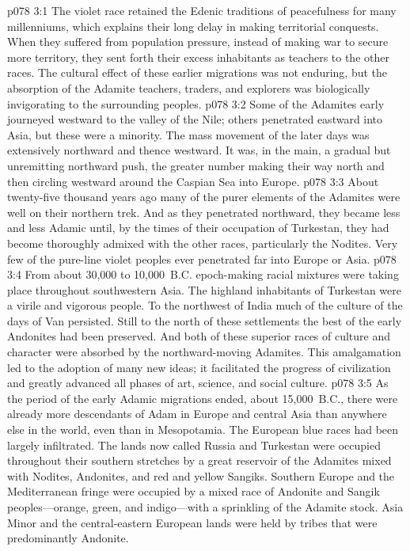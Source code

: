 \vs p078 3:1 The violet race retained the Edenic traditions of peacefulness for many millenniums, which explains their long delay in making territorial conquests. When they suffered from population pressure, instead of making war to secure more territory, they sent forth their excess inhabitants as teachers to the other races. The cultural effect of these earlier migrations was not enduring, but the absorption of the Adamite teachers, traders, and explorers was biologically invigorating to the surrounding peoples.
\vs p078 3:2 Some of the Adamites early journeyed westward to the valley of the Nile; others penetrated eastward into Asia, but these were a minority. The mass movement of the later days was extensively northward and thence westward. It was, in the main, a gradual but unremitting northward push, the greater number making their way north and then circling westward around the Caspian Sea into Europe.
\vs p078 3:3 About twenty\hyp{}five thousand years ago many of the purer elements of the Adamites were well on their northern trek. And as they penetrated northward, they became less and less Adamic until, by the times of their occupation of Turkestan, they had become thoroughly admixed with the other races, particularly the Nodites. Very few of the pure\hyp{}line violet peoples ever penetrated far into Europe or Asia.
\vs p078 3:4 From about 30,000 to 10,000~B.C. epoch\hyp{}making racial mixtures were taking place throughout southwestern Asia. The highland inhabitants of Turkestan were a virile and vigorous people. To the northwest of India much of the culture of the days of Van persisted. Still to the north of these settlements the best of the early Andonites had been preserved. And both of these superior races of culture and character were absorbed by the northward\hyp{}moving Adamites. This amalgamation led to the adoption of many new ideas; it facilitated the progress of civilization and greatly advanced all phases of art, science, and social culture.
\pc \vs p078 3:5 As the period of the early Adamic migrations ended, about 15,000~B.C., there were already more descendants of Adam in Europe and central Asia than anywhere else in the world, even than in Mesopotamia. The European blue races had been largely infiltrated. The lands now called Russia and Turkestan were occupied throughout their southern stretches by a great reservoir of the Adamites mixed with Nodites, Andonites, and red and yellow Sangiks. Southern Europe and the Mediterranean fringe were occupied by a mixed race of Andonite and Sangik peoples---orange, green, and indigo---with a sprinkling of the Adamite stock. Asia Minor and the central\hyp{}eastern European lands were held by tribes that were predominantly Andonite.
